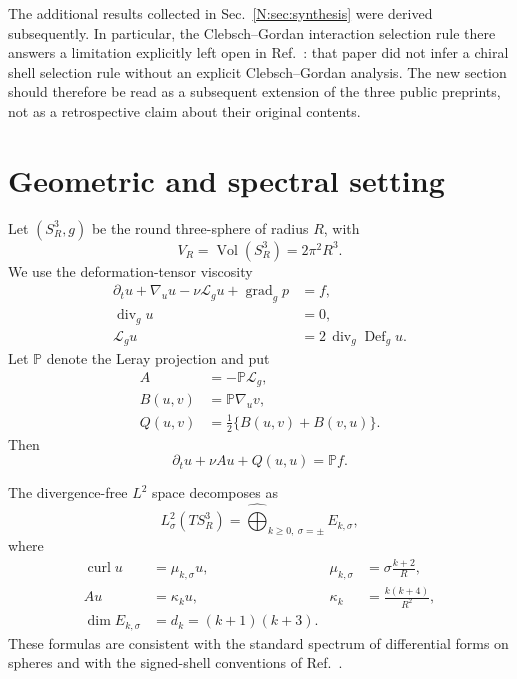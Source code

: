 \documentclass[
 aps,
 prd,
 reprint,
 amsmath,
 amssymb,
 nofootinbib,
 superscriptaddress
]{revtex4-2}
\theoremstyle{definition}
\theoremstyle{remark}
\newcommand{\Sthree}{S^3_R}
\newcommand{\PP}{\mathbb P}
\newcommand{\cL}{\mathcal L}
\newcommand{\curl}{\operatorname{curl}}
\newcommand{\divg}{\operatorname{div}_g}
\newcommand{\gradg}{\operatorname{grad}_g}
\newcommand{\Def}{\operatorname{Def}}
\newcommand{\Vol}{\operatorname{Vol}}
\begin{document}
The additional results collected in Sec.~\ref{N:sec:synthesis} were derived
subsequently.  In particular, the Clebsch--Gordan interaction selection rule
there answers a limitation explicitly left open in
Ref.~\cite{BateninPreeceKB2026}: that paper did not infer a chiral shell
selection rule without an explicit Clebsch--Gordan analysis.  The new
section should therefore be read as a subsequent extension of the three
public preprints, not as a retrospective claim about their original
contents.

\section{Geometric and spectral setting}

Let $(\Sthree,g)$ be the round three-sphere of radius $R$, with
\[
        V_R=\Vol(\Sthree)=2\pi^2R^3.
\]
We use the deformation-tensor viscosity
\[
\begin{aligned}
 \partial_tu+\nabla_u u-\nu\cL_g u+\gradg p&=f,\\
 \divg u&=0,\\
 \cL_g u&=2\,\operatorname{div}_g\Def_g u.
\end{aligned}
\]
Let $\PP$ denote the Leray projection and put
\[
\begin{aligned}
 A&=-\PP\cL_g,\\
 B(u,v)&=\PP\nabla_u v,\\
 Q(u,v)&=\frac12\{B(u,v)+B(v,u)\}.
\end{aligned}
\]
Then
\begin{equation}
       \partial_tu+\nu Au+Q(u,u)=\PP f.
       \label{G:eq:NS}
\end{equation}

The divergence-free $L^2$ space decomposes as
\begin{equation}
 L^2_\sigma(T\Sthree)
 =
 \widehat{\bigoplus}_{k\ge0,\ \sigma=\pm} E_{k,\sigma},
 \label{G:eq:signeddecomp}
\end{equation}
where
\begin{align}
 \curl u &= \mu_{k,\sigma}u,
 &
 \mu_{k,\sigma}&=\sigma\frac{k+2}{R},
 \label{G:eq:curlspec}\\
 Au &= \kappa_k u,
 &
 \kappa_k&=\frac{k(k+4)}{R^2},
 \label{G:eq:stokespec}\\
 \dim E_{k,\sigma}
 &=d_k=(k+1)(k+3).
 \label{G:eq:dim}
\end{align}
These formulas are consistent with the standard spectrum of differential
forms on spheres \cite{IkedaTaniguchi1978} and with the signed-shell
conventions of Ref.~\cite{BateninPreece2026}.
\end{document}
